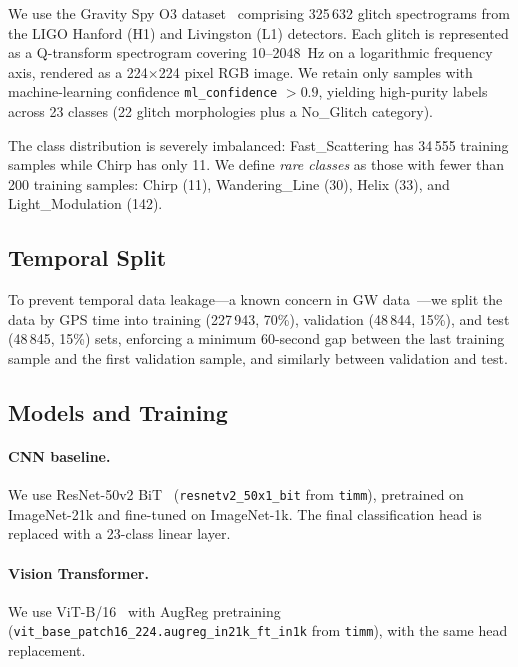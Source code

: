 \documentclass[12pt]{article}
\newcommand{\Ntrain}{227\,943}
\newcommand{\Nval}{48\,844}
\newcommand{\Ntest}{48\,845}
\newcommand{\Ntotal}{325\,632}
\newcommand{\Nclasses}{23}
\newcommand{\NrareThreshold}{200}
\begin{document}
We use the Gravity Spy O3 dataset~\citep{Zevin2017, GravitySpyZenodo}
comprising \Ntotal{} glitch spectrograms from the LIGO Hanford (H1) and
Livingston (L1) detectors.
Each glitch is represented as a Q-transform spectrogram covering
10--2048~Hz on a logarithmic frequency axis, rendered as a 224$\times$224
pixel RGB image.
We retain only samples with machine-learning confidence
\texttt{ml\_confidence} $> 0.9$, yielding high-purity labels across
\Nclasses{} classes (22 glitch morphologies plus a No\_Glitch category).

The class distribution is severely imbalanced: Fast\_Scattering has 34\,555
training samples while Chirp has only 11.
We define \emph{rare classes} as those with fewer than \NrareThreshold{}
training samples: Chirp (11), Wandering\_Line (30), Helix (33), and
Light\_Modulation (142).

\subsection{Temporal Split}
\label{sec:split}

To prevent temporal data leakage---a known concern in GW
data~\citep{Zevin2024}---we split the data by GPS time into training
(\Ntrain, 70\%), validation (\Nval, 15\%), and test (\Ntest, 15\%) sets,
enforcing a minimum 60-second gap between the last training sample and
the first validation sample, and similarly between validation and test.

\subsection{Models and Training}
\label{sec:models}

\paragraph{CNN baseline.}
We use ResNet-50v2 BiT~\citep{BiT2020} (\texttt{resnetv2\_50x1\_bit}
from \texttt{timm}), pretrained on ImageNet-21k and fine-tuned on
ImageNet-1k.
The final classification head is replaced with a \Nclasses-class linear layer.

\paragraph{Vision Transformer.}
We use ViT-B/16~\citep{Dosovitskiy2021} with AugReg
pretraining~\citep{AugReg2022}
(\texttt{vit\_base\_patch16\_224.augreg\_in21k\_ft\_in1k} from \texttt{timm}),
with the same head replacement.
\end{document}
